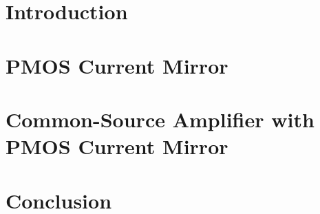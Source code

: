 \documentclass{article}
\begin{document}
\begin{titlepage}

\end{titlepage}
\section{Introduction}

\section{PMOS Current Mirror}

\section{Common-Source Amplifier with PMOS Current Mirror}

\section{Conclusion}

\end{document}
